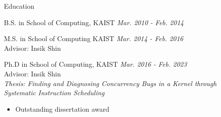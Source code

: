 
\begin{rSection}{Education}

B.S. in School of Computing, KAIST \hfill {\em Mar. 2010 - Feb. 2014}

M.S. in School of Computing KAIST \hfill {\em Mar. 2014 - Feb. 2016} \\
Advisor: Insik Shin

Ph.D in School of Computing, KAIST \hfill {\em Mar. 2016 - Feb. 2023} \\
Advisor: Insik Shin \\
\textit{Thesis: Finding and Diagnosing Concurrency Bugs in a Kernel through Systematic Instruction Scheduling}

\begin{itemize}
  \item{Outstanding  dissertation award}
\end{itemize}

\end{rSection}
